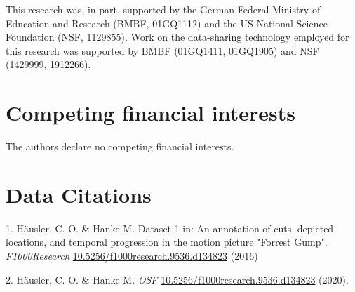 \documentclass[english]{article}
\begin{document}
This research was, in part, supported by the German Federal Ministry of
Education and Research (BMBF, 01GQ1112) and the US National Science Foundation
(NSF, 1129855). Work on the data-sharing technology employed for this research
was supported by BMBF (01GQ1411, 01GQ1905) and NSF (1429999, 1912266).

\section*{Competing financial interests}
The authors declare no competing financial interests.


{\small
}

%
%


\section{Data Citations}

1. Häusler, C. O. \& Hanke M. Dataset 1 in: An annotation of cuts, depicted
locations, and temporal progression in the motion picture "Forrest Gump".
\emph{F1000Research}
\href{https://doi.org/10.5256/f1000research.9536.d134823}{10.5256/f1000research.9536.d134823}
(2016)

2. Häusler, C. O. \& Hanke M. \emph{OSF}
\href{https://doi.org/10.17605/OSF.IO/GFRME}{10.5256/f1000research.9536.d134823}
(2020).
\end{document}
